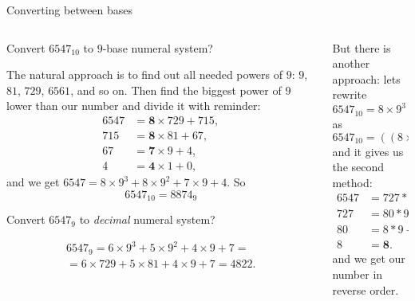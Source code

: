 \documentclass[9pt,aspectratio=169]{beamer}
\begin{document}
\begin{frame}{Converting between bases}
  \begin{columns}[T]
    \begin{column}{0.5\textwidth}
      \begin{problem}
        Convert $6547_{10}$ to $9$-base numeral system?
      \end{problem}

      The natural approach is to find out all needed powers of $9$: 
      $9$, $81$, $729$, $6561$, and so on. Then find the biggest power of $9$ lower than our number and divide it with reminder:
      \begin{align*}
        6547 &= \mathbf{8} \times 729 + 715, \\
        715 &= \mathbf{8} \times 81 + 67, \\
        67 &= \mathbf{7} \times 9 + 4, \\
        4 &= \mathbf{4} \times 1 + 0,
      \end{align*}
      and we get 
      $ 6547 = 8 \times 9^3 + 8 \times 9^2 + 7 \times 9 + 4. $
      So \[6547_{10} = 8874_{9}\] \vspace*{-0.8\baselineskip}
      \begin{problem}
        Convert $6547_{9}$ to \emph{decimal} numeral system?
      \end{problem} \vspace*{-1\baselineskip}
      \begin{multline*}
         6547_{9} = 6 \times 9^3 + 5 \times 9^2 + 4 \times 9 + 7 = \\
         = 6 \times 729 + 5 \times 81 + 4 \times 9 + 7 = 4822. 
      \end{multline*}
    \end{column}
    \begin{column}{0.5\textwidth}
      But there is another approach:
      lets rewrite
      \[ 6547_{10} = 8 \times 9^3 + 8 \times 9^2 + 7 \times 9 + 4. \]
      as
      \[ 6547_{10} = \left( \left(8 \times 9 + 8 \right) \times 9 + 7 \right) \times 9 + 4. \]
      and it gives us the second method:
      \begin{align*}
        6547 &= 727 * 9 + \mathbf{4}, \\
        727 &= 80 * 9 + \mathbf{7}, \\
        80 &= 8 * 9 + \mathbf{8}, \\
        8 &= \mathbf{8}.         
      \end{align*}
      and we get our number in reverse order. 
      

\end{column}
\end{columns}
\end{frame}
\end{document}
